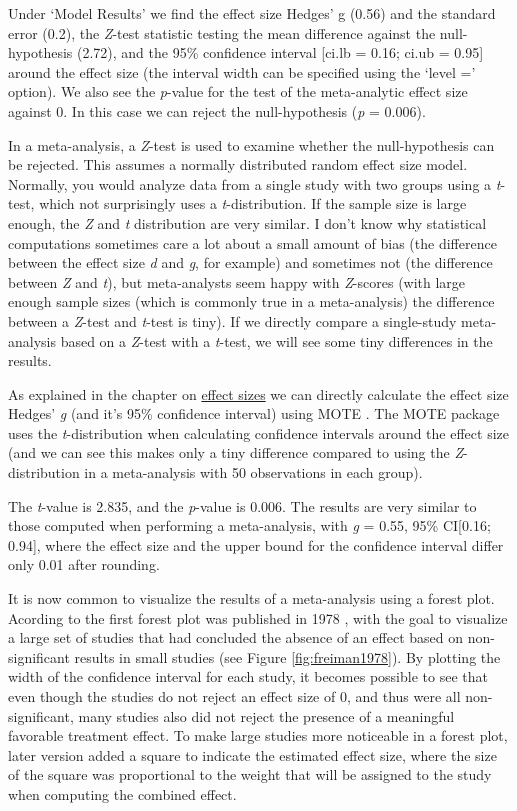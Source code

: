 \documentclass[
  oneside]{book}
\begin{document}
Under `Model Results' we find the effect size Hedges' g (0.56) and the standard error (0.2), the \emph{Z}-test statistic testing the mean difference against the null-hypothesis (2.72), and the 95\% confidence interval {[}ci.lb = 0.16; ci.ub = 0.95{]} around the effect size (the interval width can be specified using the `level =' option). We also see the \emph{p}-value for the test of the meta-analytic effect size against 0. In this case we can reject the null-hypothesis (\emph{p} = 0.006).

In a meta-analysis, a \emph{Z}-test is used to examine whether the null-hypothesis can be rejected. This assumes a normally distributed random effect size model. Normally, you would analyze data from a single study with two groups using a \emph{t}-test, which not surprisingly uses a \emph{t}-distribution. If the sample size is large enough, the \emph{Z} and \emph{t} distribution are very similar. I don't know why statistical computations sometimes care a lot about a small amount of bias (the difference between the effect size \emph{d} and \emph{g}, for example) and sometimes not (the difference between \emph{Z} and \emph{t}), but meta-analysts seem happy with \emph{Z}-scores (with large enough sample sizes (which is commonly true in a meta-analysis) the difference between a \emph{Z}-test and \emph{t}-test is tiny). If we directly compare a single-study meta-analysis based on a \emph{Z}-test with a \emph{t}-test, we will see some tiny differences in the results.

As explained in the chapter on \protect\hyperlink{effectsize}{effect sizes} we can directly calculate the effect size Hedges' \emph{g} (and it's 95\% confidence interval) using MOTE \citep{buchanan_mote_2017}. The MOTE package uses the \emph{t}-distribution when calculating confidence intervals around the effect size (and we can see this makes only a tiny difference compared to using the \emph{Z}-distribution in a meta-analysis with 50 observations in each group).

The \emph{t}-value is 2.835, and the \emph{p}-value is 0.006. The results are very similar to those computed when performing a meta-analysis, with \emph{g} = 0.55, 95\% CI{[}0.16; 0.94{]}, where the effect size and the upper bound for the confidence interval differ only 0.01 after rounding.

It is now common to visualize the results of a meta-analysis using a forest plot. Acording to \citet{cooper_handbook_2009} the first forest plot was published in 1978 \citep{freiman_importance_1978}, with the goal to visualize a large set of studies that had concluded the absence of an effect based on non-significant results in small studies (see Figure \ref{fig:freiman1978}). By plotting the width of the confidence interval for each study, it becomes possible to see that even though the studies do not reject an effect size of 0, and thus were all non-significant, many studies also did not reject the presence of a meaningful favorable treatment effect. To make large studies more noticeable in a forest plot, later version added a square to indicate the estimated effect size, where the size of the square was proportional to the weight that will be assigned to the study when computing the combined effect.
\end{document}
